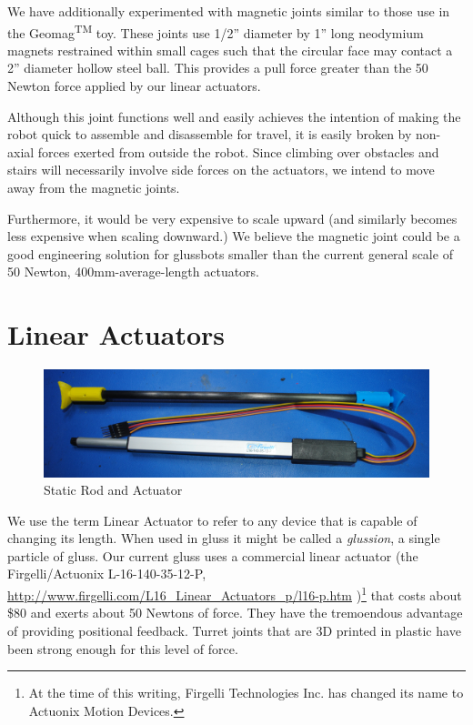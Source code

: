\documentclass[11pt]{article}
\begin{document}
We have additionally experimented with magnetic joints similar to those use in the Geomag\textsuperscript{TM} toy.
These joints use 1/2'' diameter by 1'' long neodymium magnets restrained within small cages such that the circular face
may contact a 2'' diameter hollow steel ball.  This provides a pull force greater than the 50 Newton force applied by our linear
actuators.

Although this joint functions well and easily achieves the intention of making the robot quick to assemble and
disassemble for travel,
it is easily broken by non-axial forces exerted from outside the robot.
Since climbing over obstacles and stairs will necessarily involve side forces on the actuators,
we intend to move away from the magnetic joints.

Furthermore, it would be very expensive to scale upward (and similarly becomes less expensive when
scaling downward.) We believe the magnetic joint could be a good engineering solution for glussbots smaller than the current
general scale of 50 Newton, 400mm-average-length actuators.


\section{Linear Actuators}
\label{linearactuators}

\begin{figure}[H]
  \centering
    \includegraphics[width=1.0\textwidth]{figures/CarbonFiberAndActuator.jpg}
    \caption[Static Rod and Actuator]{Static Rod and Actuator}
      \label{rodAndActuator}
\end{figure}

We use the term Linear Actuator to refer to any device that is capable of changing its length. When
used in gluss it might be called a \emph{glussion}, a single particle of gluss. Our current gluss
uses a commercial linear actuator (the Firgelli/Actuonix L-16-140-35-12-P,
\url{http://www.firgelli.com/L16_Linear_Actuators_p/l16-p.htm}
)\footnote{At the time of this writing, Firgelli Technologies Inc. has changed its name to Actuonix Motion Devices.}
that costs about \$80 and exerts about 50 Newtons of force.
They have the tremoendous advantage
of providing positional feedback.
Turret joints that are 3D printed in plastic have been strong enough for this level of force.
\end{document}
